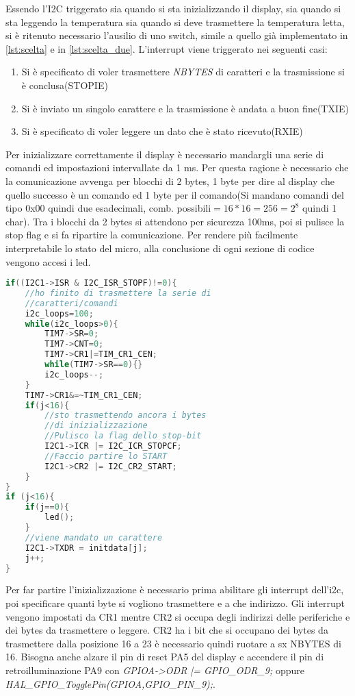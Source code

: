 \documentclass[main.tex]{subfiles}
\begin{document}
Essendo l'I2C triggerato sia quando si sta inizializzando il display, sia quando si sta leggendo la temperatura sia quando si deve trasmettere la temperatura letta, si è ritenuto necessario l'ausilio di uno switch, simile a quello già implementato in \ref{lst:scelta} e in \ref{lst:scelta_due}.
L'interrupt viene triggerato nei seguenti casi:\begin{enumerate}
    \item Si è specificato di voler trasmettere \textit{NBYTES} di caratteri e la trasmissione si è conclusa(STOPIE)
    \item Si è inviato un singolo carattere e la trasmissione è andata a buon fine(TXIE)
    \item Si è specificato di voler leggere un dato che è stato ricevuto(RXIE)
\end{enumerate}
Per inizializzare correttamente il display è necessario mandargli una serie di comandi ed impostazioni intervallate da 1 ms. Per questa ragione è necessario che la comunicazione avvenga per blocchi di 2 bytes, 1 byte per dire al display che quello successo è un comando ed 1 byte per il comando(Si mandano comandi del tipo 0x00 quindi due esadecimali, comb. possibili$=16*16=256=2^8$ quindi 1 char). Tra i blocchi da 2 bytes si attendono per sicurezza 100ms, poi si pulisce la stop flag e si fa ripartire la comunicazione. 
Per rendere più facilmente interpretabile lo stato del micro, alla conclusione di ogni sezione di codice vengono accesi i led.
\begin{lstlisting}[language=C, caption=Gestione Interrupt I2C per inizializzazione Display]
if((I2C1->ISR & I2C_ISR_STOPF)!=0){
    //ho finito di trasmettere la serie di 
    //caratteri/comandi
	i2c_loops=100;
	while(i2c_loops>0){
		TIM7->SR=0;
		TIM7->CNT=0;
		TIM7->CR1|=TIM_CR1_CEN;
		while(TIM7->SR==0){}
		i2c_loops--;
	}
	TIM7->CR1&=~TIM_CR1_CEN;
	if(j<16){
	    //sto trasmettendo ancora i bytes 
	    //di inizializzazione
	    //Pulisco la flag dello stop-bit
		I2C1->ICR |= I2C_ICR_STOPCF;
		//Faccio partire lo START
		I2C1->CR2 |= I2C_CR2_START; 
	}
}
if (j<16){
	if(j==0){
		led();
	}
	//viene mandato un carattere
	I2C1->TXDR = initdata[j];
	j++; 
}
\end{lstlisting}
Per far partire l'inizializzazione è necessario prima abilitare gli interrupt dell'i2c, poi specificare quanti byte si vogliono trasmettere e a che indirizzo. 
Gli interrupt vengono impostati da CR1 mentre CR2 si occupa degli indirizzi delle periferiche e dei bytes da trasmettere o leggere. CR2 ha i bit che si occupano dei bytes da trasmettere dalla posizione 16 a 23 è necessario quindi ruotare a sx NBYTES di 16. Bisogna anche alzare il pin di reset PA5 del display e accendere il pin di retroilluminazione PA9 con \textit{GPIOA->ODR |= GPIO\_ODR\_9;} oppure \textit{HAL\_GPIO\_TogglePin(GPIOA,GPIO\_PIN\_9);}.
\end{document}
